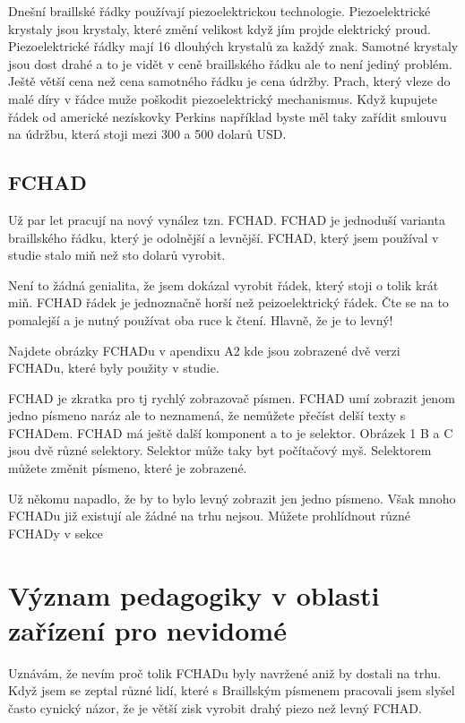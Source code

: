 Dnešní braillské řádky používají piezoelektrickou technologie.  Piezoelektrické krystaly jsou krystaly, které změní velikost když jím projde elektrický proud. Piezoelektrické řádky mají 16 dlouhých krystalů za každý znak.  Samotné krystaly jsou dost drahé a to je vidět v ceně braillského řádku ale to není jediný problém.  Ještě větší cena než cena samotného řádku je cena údržby.  Prach, který vleze do malé díry v řádce muže poškodit piezoelektrický mechanismus.  Když kupujete řádek od americké nezískovky Perkins například byste měl taky zařídit smlouvu na údržbu, která stoji mezi 300 a 500 dolarů USD\citep{perkinsdisplays}.

\subsection{FCHAD}

Už par let pracují na nový vynález tzn. FCHAD. FCHAD je jednoduší varianta braillského řádku, který je odolnější a levnější.  FCHAD, který jsem používal v studie stalo miň než sto dolarů vyrobit.

Není to žádná genialita, že jsem dokázal vyrobit řádek, který stoji o tolik krát miň.  FCHAD řádek je jednoznačně horší než peizoelektrický řádek.  Čte se na to pomalejší a je nutný používat oba ruce k čtení.  Hlavně, že je to levný!

Najdete obrázky FCHADu v apendixu A2 kde jsou zobrazené dvě verzi FCHADu, které byly použity v studie.

FCHAD je zkratka pro  tj rychlý zobrazovač písmen.  FCHAD umí zobrazit jenom jedno písmeno naráz ale to neznamená, že nemůžete přečíst delší texty s FCHADem.  FCHAD má ještě další komponent a to je selektor.  Obrázek 1 B a C jsou dvě různé selektory.  Selektor může taky byt počítačový myš.  Selektorem můžete změnit písmeno, které je zobrazené.

Už někomu napadlo, že by to bylo levný zobrazit jen jedno písmeno. Však mnoho FCHADu již existují ale žádné na trhu nejsou.  Můžete prohlídnout různé FCHADy v sekce 

\section{Význam pedagogiky v oblasti zařízení pro nevidomé}

Uznávám, že nevím proč tolik FCHADu byly navržené aniž by dostali na trhu.  Když jsem se zeptal různé lidí, které s Braillským písmenem pracovali jsem slyšel často cynický názor, že je větší zisk vyrobit drahý piezo než levný FCHAD.


